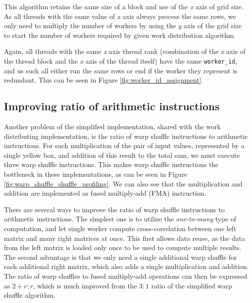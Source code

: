 This algorithm retains the same size of a block and use of the \textit{x} axis of grid size. As all threads with the same value of \textit{x} axis always process the same rows, we only need to multiply the number of workers by using the \textit{y} axis of the grid size to start the number of workers required by given work distribution algorithm. 

Again, all threads with the same \textit{x} axis thread rank (combination of the \textit{x} axis of the thread block and the \textit{x} axis of the thread itself) have the same \texttt{worker\_id}, and us such all either run the same rows or end if the worker they represent is redundant. This can be seen in Figure \ref{fig:worker_id_assignment}.



\subsection{Improving ratio of arithmetic instructions}
\label{sec:arith_ratio}

Another problem of the simplified implementation, shared with the work distributing implementation, is the ratio of warp shuffle instructions to arithmetic instructions. For each multiplication of the pair of input values, represented by a single yellow box, and addition of this result to the total sum, we must execute three warp shuffle instructions. This makes warp shuffle instructions the bottleneck in these implementations, as can be seen in Figure \ref{fig:warp_shuffle_shuffle_profiling}. We can also see that the multiplication and addition are implemented as fused multiply-add (FMA) instruction. 

There are several ways to improve the ratio of warp shuffle instructions to arithmetic instructions. The simplest one is to utilize the \textit{one-to-many} type of computation, and let single worker compute cross-correlation between one left matrix and many right matrices at once. This first allows data reuse, as the data from the left matrix is loaded only once to be used to compute multiple results. The second advantage is that we only need a single additional warp shuffle for each additional right matrix, which also adds a single multiplication and addition. The ratio of warp shuffles to fused multiply-add operations can then be expressed as $2 + r : r$, which is much improved from the $3:1$ ratio of the simplified warp shuffle algorithm.

